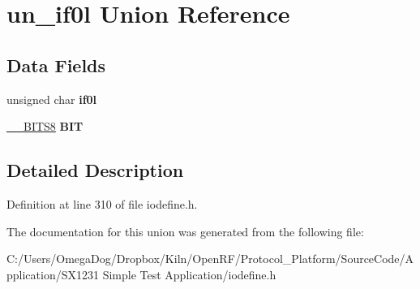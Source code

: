 \hypertarget{unionun__if0l}{\section{un\-\_\-if0l Union Reference}
\label{unionun__if0l}
}
\subsection*{Data Fields}
\begin{DoxyCompactItemize}
\item 
\hypertarget{unionun__if0l_a25a8123949c6659a43f618510decb3dc}{unsigned char {\bfseries if0l}}\label{unionun__if0l_a25a8123949c6659a43f618510decb3dc}

\item 
\hypertarget{unionun__if0l_a75cdc5bcec9174897bbecc2f87a81025}{\hyperlink{struct_____b_i_t_s8}{\-\_\-\-\_\-\-B\-I\-T\-S8} {\bfseries B\-I\-T}}\label{unionun__if0l_a75cdc5bcec9174897bbecc2f87a81025}

\end{DoxyCompactItemize}


\subsection{Detailed Description}


Definition at line 310 of file iodefine.\-h.



The documentation for this union was generated from the following file\-:\begin{DoxyCompactItemize}
\item 
C\-:/\-Users/\-Omega\-Dog/\-Dropbox/\-Kiln/\-Open\-R\-F/\-Protocol\-\_\-\-Platform/\-Source\-Code/\-Application/\-S\-X1231 Simple Test Application/iodefine.\-h\end{DoxyCompactItemize}
